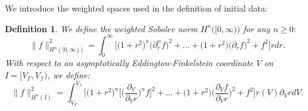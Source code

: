 \documentclass[11pt]{article}
\newtheorem{definition}{Definition}[section]
\numberwithin{equation}{section}
\begin{document}
We introduce the weighted spaces used in the definition of initial data:
\begin{definition}
    We define the weighted Sobolev norm $H^n\big([0,\infty)\big)$ for any $n\geq0:$
    \begin{equation}\label{weighted Sobolev space r}
        \big\|f\big\|_{H^n([0,\infty))}^2=\int_{0}^{\infty}\bigg[\big(1+r^2\big)^n\Big(\partial_r^nf\Big)^2+\ldots+\big(1+r^2\big)\Big(\partial_rf\Big)^2+f^2\bigg]rdr.
    \end{equation}
    With respect to an asymptotically Eddington-Finkelstein coordinate $V$ on  $I=\big[V_{\Gamma},V_{\mathcal{I}}\big)$, we define:
    \begin{equation}\label{weighted Sobolev space V}
        \big\|f\big\|_{H^n(I)}^2=\int_{V_{\Gamma}}^{V_{\mathcal{I}}}\bigg[\big(1+r^2\big)^n\bigg[\bigg(\frac{\partial_V}{\partial_Vr}\bigg)^nf\bigg]^2+\ldots+\big(1+r^2\big)\bigg(\frac{\partial_Vf}{\partial_Vr}\bigg)^2+f^2\bigg]r(V)\partial_VrdV.
    \end{equation}
\end{definition}
\end{document}
